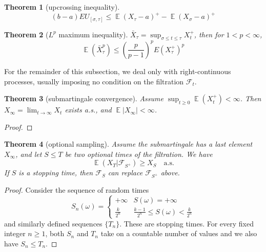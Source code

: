 \documentclass{article}
\newtheorem{Thm}{Theorem}[section]
\theoremstyle{definition}
\newcommand{\EE}{\operatorname{\mathbb{E}}}
\renewcommand{\leq}{\leqslant}
\renewcommand{\geq}{\geqslant}
\newcommand{\<}{\left\langle}
\renewcommand{\>}{\right\rangle}
\begin{document}
\begin{Thm}[upcrossing inequality]
    \[(b-a)EU_{[\sigma,\tau]}\leq \EE(X_\tau-a)^+-\EE(X_\sigma-a)^+\]
\end{Thm}

\begin{Thm}[$L^p$ maximum inequality]
    $\bar{X}_\tau= \sup_{\sigma\leq t\leq \tau}X_t^+$, then for $1<p<\infty$, \[\EE(\bar{X}_\tau^p)\leq (\frac{p}{p-1})^pE(X_\tau^+)^p\]
\end{Thm}



For the remainder of this subsection, we deal only with right-continuous processes,
usually imposing no condition on the filtration $\mathcal{F}_t$.
\begin{Thm}[submartingale convergence]
    Assume $\sup_{t\geq 0} \EE(X_t^+)<\infty$. Then $X_\infty =\lim_{t\to\infty} X_t$ exists a.s., and $\EE|X_\infty|<\infty$.
\end{Thm}
\begin{proof}
    
\end{proof}

\begin{Thm}[optional sampling]
    Assume the submartingale has a last element $X_\infty$,
    and let $S\leq T$ be two optional times of the filtration. We have 
    \[ \EE(X_T|\mathcal{F}_{S^+})\geq X_S \quad \text{a.s.}\] 
    If $S$ is a stopping time, then $\mathcal{F}_S$ can replace $\mathcal{F}_{S^+}$ above.
\end{Thm}
\begin{proof}
    Consider the sequence of random times 
    \[S_n(\omega)=\left\{\begin{matrix}
        +\infty   & S(\omega )=+\infty \\
        \frac{k}{2^n}   & \frac{k-1}{2^n} \leq S(\omega )<\frac{k}{2^n} 
        \end{matrix}\right. \]
    and similarly defined sequences $\{T_n\}$. These are stopping times.
    For every fixed integer $n\geq 1$, both $S_n$ and $T_n$ take on a countable number of values and we also have $S_n\leq T_n$.
\end{proof}
\end{document}
